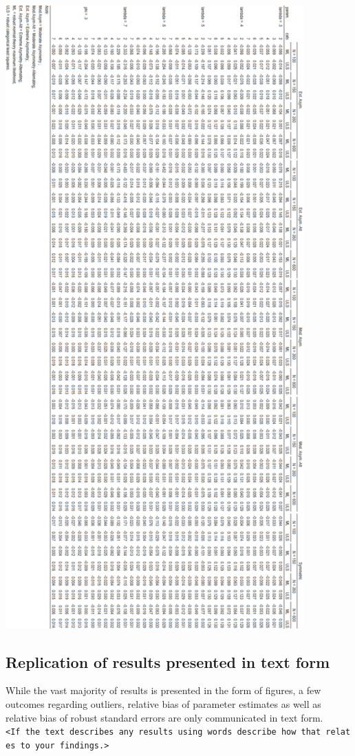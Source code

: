 \documentclass[10,a4paperpaper,]{article}
\begin{document}
\includegraphics[width=325pt]{./figures/tabA7}

\subsection{Replication of results presented in text form}

While the vast majority of results is presented in the form of figures,
a few outcomes regarding outliers, relative bias of parameter estimates
as well as relative bias of robust standard errors are only communicated
in text form.
\texttt{\textless{}If\ the\ text\ describes\ any\ results\ using\ words\ describe\ how\ that\ relates\ to\ your\ findings.\textgreater{}}
\end{document}
